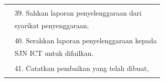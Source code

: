 \documentclass[
]{article}
\begin{document}
\begin{longtable}[]{@{}ll@{}}
\begin{minipage}[t]{0.71\columnwidth}
\strut
\end{minipage}\tabularnewline
\begin{minipage}[t]{0.23\columnwidth}\raggedright
\strut
\end{minipage} & \begin{minipage}[t]{0.71\columnwidth}\raggedright
39. Sahkan laporan penyelenggaraan dari\strut
\end{minipage}\tabularnewline
\begin{minipage}[t]{0.23\columnwidth}\raggedright
\strut
\end{minipage} & \begin{minipage}[t]{0.71\columnwidth}\raggedright
syarikat penyenggaraan.\strut
\end{minipage}\tabularnewline
\begin{minipage}[t]{0.23\columnwidth}\raggedright
\strut
\end{minipage} & \begin{minipage}[t]{0.71\columnwidth}\raggedright
\strut
\end{minipage}\tabularnewline
\begin{minipage}[t]{0.23\columnwidth}\raggedright
\strut
\end{minipage} & \begin{minipage}[t]{0.71\columnwidth}\raggedright
40. Serahkan laporan penyelenggaraan kepada\strut
\end{minipage}\tabularnewline
\begin{minipage}[t]{0.23\columnwidth}\raggedright
\strut
\end{minipage} & \begin{minipage}[t]{0.71\columnwidth}\raggedright
SJN ICT untuk difailkan.\strut
\end{minipage}\tabularnewline
\begin{minipage}[t]{0.23\columnwidth}\raggedright
\strut
\end{minipage} & \begin{minipage}[t]{0.71\columnwidth}\raggedright
\strut
\end{minipage}\tabularnewline
\begin{minipage}[t]{0.23\columnwidth}\raggedright
\strut
\end{minipage} & \begin{minipage}[t]{0.71\columnwidth}\raggedright
41. Catatkan pembaikan yang telah dibuat,\strut
\end{minipage}\tabularnewline
\begin{minipage}[t]{0.23\columnwidth}\raggedright
\strut
\end{minipage} & \begin{minipage}[t]{0.71\columnwidth}\raggedright

\end{minipage}
\end{longtable}
\end{document}
